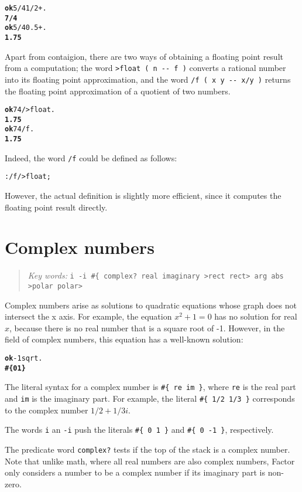 \documentclass[english]{book}
\newcommand{\chapkeywords}[1]{%
\begin{quote}
\emph{Key words:} \texttt{#1}
\end{quote}
}
\begin{document}
\begin{alltt}
\textbf{ok} 5/4 1/2 + .
\textbf{7/4}
\textbf{ok} 5/4 0.5 + .
\textbf{1.75}
\end{alltt}

Apart from contaigion, there are two ways of obtaining a floating point result from a computation; the word \texttt{>float ( n -{}- f )} converts a rational number into its floating point approximation, and the word \texttt{/f ( x y -{}- x/y )} returns the floating point approximation of a quotient of two numbers.

\begin{alltt}
\textbf{ok} 7 4 / >float .
\textbf{1.75}
\textbf{ok} 7 4 /f .
\textbf{1.75}
\end{alltt}

Indeed, the word \texttt{/f} could be defined as follows:

\begin{alltt}
: /f / >float ;
\end{alltt}

However, the actual definition is slightly more efficient, since it computes the floating point result directly.

\section{Complex numbers}

\chapkeywords{i -i \#\{ complex?~real imaginary >rect rect> arg abs >polar polar>}

Complex numbers arise as solutions to quadratic equations whose graph does not intersect the x axis. For example, the equation $x^2 + 1 = 0$ has no solution for real $x$, because there is no real number that is a square root of -1. However, in the field of complex numbers, this equation has a well-known solution:

\begin{alltt}
\textbf{ok} -1 sqrt .
\textbf{\#\{ 0 1 \}}
\end{alltt}

The literal syntax for a complex number is \texttt{\#\{ re im \}}, where \texttt{re} is the real part and \texttt{im} is the imaginary part. For example, the literal \texttt{\#\{ 1/2 1/3 \}} corresponds to the complex number $1/2 + 1/3i$.

The words \texttt{i} an \texttt{-i} push the literals \texttt{\#\{ 0 1 \}} and \texttt{\#\{ 0 -1 \}}, respectively.

The predicate word \texttt{complex?} tests if the top of the stack is a complex number. Note that unlike math, where all real numbers are also complex numbers, Factor only considers a number to be a complex number if its imaginary part is non-zero.
\end{document}
